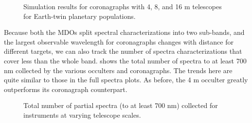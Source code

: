 \begin{figure}[ht]
\begin{center}
\begin{tabular}{c c}
   \end{tabular}
 \end{center}
 \caption[Coronagraph comparison]{ \label{fig:compcorons} Simulation results for coronagraphs with 4, 8, and 16 m telescopes for Earth-twin planetary populations.}
 \end{figure}
 Because both the MDOs split spectral characterizations into two sub-bands, and the largest observable wavelength for coronagraphs changes with distance for different targets, we can also track the number of spectra characterizations that cover less than the whole band.   shows the total number of spectra to at least 700 nm collected by the various occulters and coronagraphs.  The trends here are quite similar to those in the full spectra plots.  As before, the 4 m occulter greatly outperforms its coronagraph counterpart.
   \begin{figure}[ht]
 \centering
{}
\caption[Partial spectra]{ \label{fig:pspectra} Total number of partial spectra (to at least 700 nm) collected for instruments at varying telescope scales.}
 \end{figure}
 
